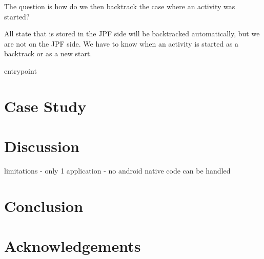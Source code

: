 \documentclass{sig-alternate}
\begin{document}
The question is how do we then backtrack the case where an activity was started?

All state that is stored in the JPF side will be backtracked automatically, but we are not on the JPF side. We have to know when an
activity is started as a backtrack or as a new start. 






entrypoint 
\newpage
\section{Case Study}





\section{Discussion}


limitations
- only 1 application
- no android native code can be handled

\section{Conclusion}






\section{Acknowledgements}

%

% 
\end{document}

